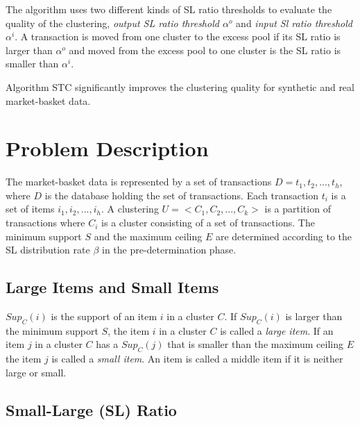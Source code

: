 \documentclass[11pt,reqno]{amsart}
\theoremstyle{definition}
\numberwithin{equation}{subsection}
\begin{document}
	The algorithm uses two different kinds of SL ratio thresholds to evaluate the quality of the clustering, {\em output SL ratio threshold $\alpha^o$} and {\em input Sl ratio threshold $\alpha^i$}. A transaction is moved from one cluster to the excess pool if its SL ratio is larger than $\alpha^o$ and moved from the excess pool to one cluster is the SL ratio is smaller than $\alpha^i$.
	
Algorithm STC significantly improves the clustering quality for synthetic and real market-basket data. 


\section{Problem Description}

The market-basket data is represented by a set of transactions $D = {t_1, t_2, ..., t_h}$, where $D$ is the database holding the set of transactions. Each transaction $t_i$ is a set of items ${i_1, i_2,...,i_h}$. A clustering $U =< C_1, C_2, ..., C_k>$ is a partition of transactions where $C_i$ is a cluster consisting of a set of transactions. The minimum support $S$ and the maximum ceiling $E$ are determined according to the SL distribution rate $\beta$ in the pre-determination phase. 

\subsection{Large Items and Small Items}


$Sup_C(i)$ is the support of an item $i$ in a cluster $C$. If $Sup_C(i)$ is larger than the minimum support $S$, the item $i$ in a cluster $C$ is  called a {\em large item}. If an item $j$ in a cluster $C$ has a $Sup_C(j)$ that is smaller than the maximum ceiling $E$ the item $j$ is called a {\em small item}. An item is called a middle item if it is neither large or small.

\subsection{Small-Large (SL) Ratio}
\end{document}
